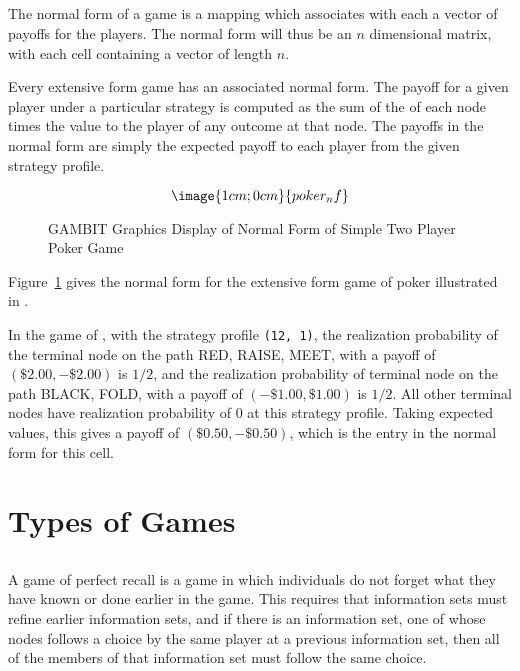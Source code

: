 \subsection{}\label{normformsec}
The normal form of a game is a mapping which associates with 
each  a vector of
 payoffs for the players.  The normal form will thus be an $n$ dimensional 
matrix, with each cell containing a vector of length $n$.

Every extensive form game has an associated normal form.  The payoff for 
a given player under a particular strategy is computed as the sum of the 
 of each node times the 
value to the player of any outcome at that node.  The payoffs in the normal 
form are simply the expected payoff to each player from the given strategy
 profile.  

\begin{figure}
$$\image{1cm;0cm}{poker_nf}$$
\caption{GAMBIT Graphics Display of Normal Form of
		Simple Two Player Poker Game}\label{fig_samp2}
\end{figure}

Figure~\ref{fig_samp2} gives the normal form for the extensive form game 
of poker illustrated in 
. 

In the game of  , with the 
strategy profile {\tt (12, 1)}, the realization probability of the terminal 
node on the path RED, RAISE, MEET, with a payoff of $(\$2.00, -\$2.00)$ 
is $1/2$, and the realization probability of terminal node on the path 
BLACK, FOLD, with a payoff of  $(-\$1.00, \$1.00)$ is $1/2$.    All other 
terminal nodes have realization probability of $0$ at this strategy profile.  
Taking expected values, this gives a payoff of  
$(\$0.50, -\$0.50)$, which is the entry in the normal form for this cell.  

\section{Types of Games}
\subsection{}\label{perfrecallsec}
A game of perfect recall is a game in which individuals do not forget what
they have known or done earlier in the game.  This requires that
information sets must refine earlier information sets, and if there is
an information set, one of whose nodes follows a choice by the same player
at a previous information set, then all of the members of that information
set must follow the same choice.

